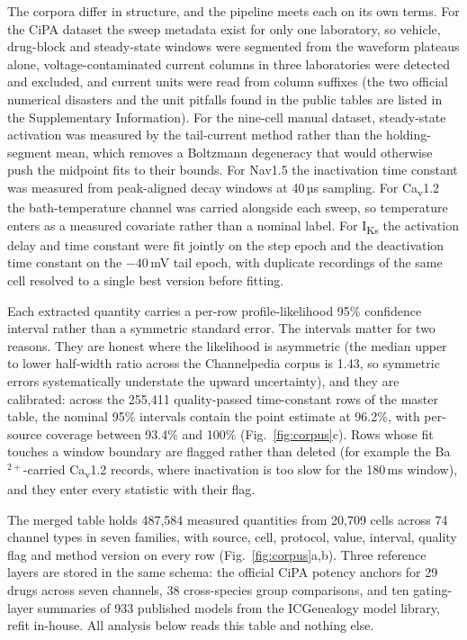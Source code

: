 \documentclass[11pt,a4paper]{article}
\begin{document}
The corpora differ in structure, and the pipeline meets each on its own terms.
For the CiPA dataset the sweep metadata exist for only one laboratory, so
vehicle, drug-block and steady-state windows were segmented from the waveform
plateaus alone, voltage-contaminated current columns in three laboratories were
detected and excluded, and current units were read from column suffixes (the
two official numerical disasters and the unit pitfalls found in the public
tables are listed in the Supplementary Information). For the nine-cell manual
dataset, steady-state activation was measured by the tail-current method rather
than the holding-segment mean, which removes a Boltzmann degeneracy that would
otherwise push the midpoint fits to their bounds. For Nav1.5 the inactivation
time constant was measured from peak-aligned decay windows at 40\,µs sampling.
For Ca\textsubscript{v}1.2 the bath-temperature channel was carried alongside
each sweep, so temperature enters as a measured covariate rather than a nominal
label. For I\textsubscript{Ks} the activation delay and time constant were fit
jointly on the step epoch and the deactivation time constant on the $-40$\,mV
tail epoch, with duplicate recordings of the same cell resolved to a single
best version before fitting.

Each extracted quantity carries a per-row profile-likelihood 95\% confidence
interval rather than a symmetric standard error. The intervals matter for two
reasons. They are honest where the likelihood is asymmetric (the median upper to
lower half-width ratio across the Channelpedia corpus is 1.43, so symmetric
errors systematically understate the upward uncertainty), and they are
calibrated: across the 255,411 quality-passed time-constant rows of the master
table, the nominal 95\% intervals contain the point estimate at 96.2\%, with
per-source coverage between 93.4\% and 100\% (Fig.~\ref{fig:corpus}c). Rows whose
fit touches a window boundary are flagged rather than deleted (for example the
Ba$^{2+}$-carried Ca\textsubscript{v}1.2 records, where inactivation is too slow
for the 180\,ms window), and they enter every statistic with their flag.

The merged table holds 487,584 measured quantities from 20,709 cells across 74
channel types in seven families, with source, cell, protocol, value, interval,
quality flag and method version on every row (Fig.~\ref{fig:corpus}a,b). Three
reference layers are stored in the same schema: the official CiPA potency anchors
for 29 drugs across seven channels, 38 cross-species group comparisons, and ten
gating-layer summaries of 933 published models from the ICGenealogy model
library, refit in-house. All analysis below reads this table and nothing else.
\end{document}
